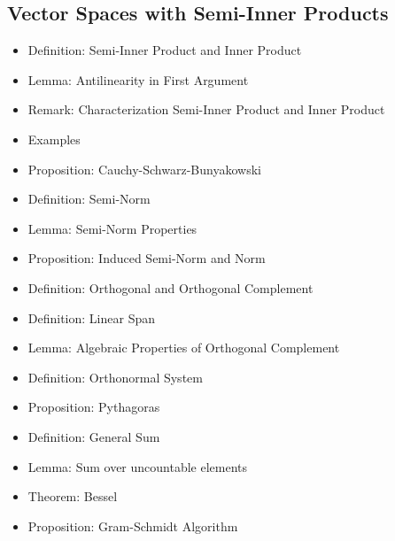 \documentclass[8pt,twocolumn]{article}
\begin{document}
    \subsection{Vector Spaces with Semi-Inner Products} %
    \label{sub:vector_spaces_with_semi_inner_products}
      \begin{itemize}
        \item Definition: Semi-Inner Product and Inner Product
        \item Lemma: Antilinearity in First Argument
        \item Remark: Characterization Semi-Inner Product and Inner Product
        \item Examples
        \item Proposition: Cauchy-Schwarz-Bunyakowski
        \item Definition: Semi-Norm
        \item Lemma: Semi-Norm Properties
        \item Proposition: Induced Semi-Norm and Norm
        \item Definition: Orthogonal and Orthogonal Complement
        \item Definition: Linear Span
        \item Lemma: Algebraic Properties of Orthogonal Complement
        \item Definition: Orthonormal System
        \item Proposition: Pythagoras
        \item Definition: General Sum
        \item Lemma: Sum over uncountable elements
        \item Theorem: Bessel
        \item Proposition: Gram-Schmidt Algorithm
      \end{itemize}
\end{document}
